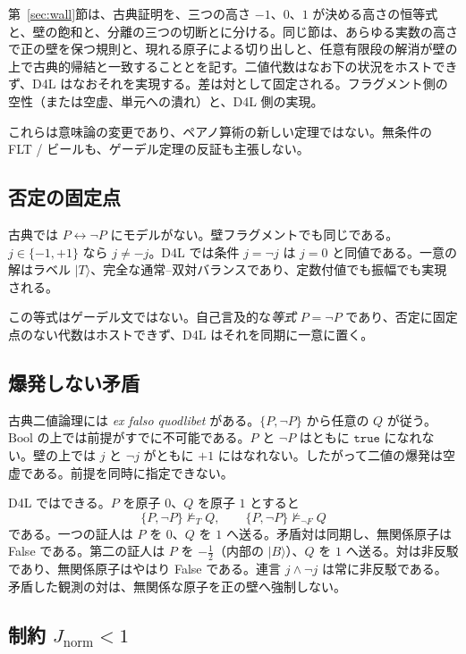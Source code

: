 \documentclass[a4paper]{article}
\theoremstyle{definition}
\newcommand{\Jnorm}{J_{\mathrm{norm}}}
\begin{document}
第~\ref{sec:wall}節は、古典証明を、三つの高さ \(-1\)、\(0\)、\(1\) が決める高さの恒等式と、壁の飽和と、分離の三つの切断とに分ける。同じ節は、あらゆる実数の高さで正の壁を保つ規則と、現れる原子による切り出しと、任意有限段の解消が壁の上で古典的帰結と一致することとを記す。二値代数はなお下の状況をホストできず、D4L はなおそれを実現する。差は対として固定される。フラグメント側の空性（または空虚、単元への潰れ）と、D4L 側の実現。

これらは意味論の変更であり、ペアノ算術の新しい定理ではない。無条件の FLT / ビールも、ゲーデル定理の反証も主張しない。

\subsection{否定の固定点}
\label{sec:ex-fp}

古典では \(P\leftrightarrow\neg P\) にモデルがない。壁フラグメントでも同じである。\(j\in\{-1,+1\}\) なら \(j\neq -j\)。D4L では条件 \(j=\neg j\) は \(j=0\) と同値である。一意の解はラベル \(\lvert T\rangle\)、完全な通常–双対バランスであり、定数付値でも振幅でも実現される。

この等式はゲーデル文ではない。自己言及的な\emph{等式} \(P=\neg P\) であり、否定に固定点のない代数はホストできず、D4L はそれを同期に一意に置く。

\subsection{爆発しない矛盾}
\label{sec:ex-efq}

古典二値論理には \emph{ex falso quodlibet} がある。\(\{P,\neg P\}\) から任意の \(Q\) が従う。\(\mathrm{Bool}\) の上では前提がすでに不可能である。\(P\) と \(\neg P\) はともに \(\mathtt{true}\) になれない。壁の上では \(j\) と \(\neg j\) がともに \(+1\) にはなれない。したがって二値の爆発は空虚である。前提を同時に指定できない。

D4L ではできる。\(P\) を原子 \(0\)、\(Q\) を原子 \(1\) とすると
\[
\{P,\neg P\}\not\models_T Q,\qquad
\{P,\neg P\}\not\models_{\lnot F} Q
\]
である。一つの証人は \(P\) を \(0\)、\(Q\) を \(1\) へ送る。矛盾対は同期し、無関係原子は False である。第二の証人は \(P\) を \(-\tfrac12\)（内部の \(\lvert B\rangle\)）、\(Q\) を \(1\) へ送る。対は非反駁であり、無関係原子はやはり False である。連言 \(j\wedge\neg j\) は常に非反駁である。矛盾した観測の対は、無関係な原子を正の壁へ強制しない。

\subsection{\texorpdfstring{制約 \(\Jnorm<1\)}{制約 Jnorm < 1}}
\label{sec:ex-notF}
\end{document}
